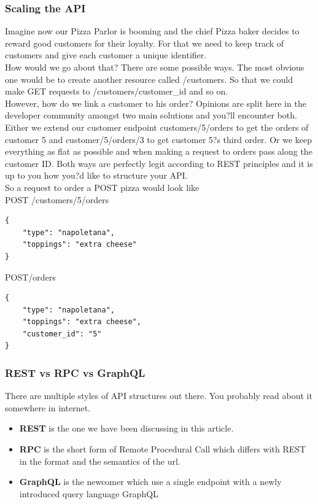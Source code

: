 \documentclass[a4paper]{article}
\begin{document}
\subsubsection{Scaling the API}
Imagine now our Pizza Parlor is booming and the chief Pizza baker decides to reward good customers for their loyalty. For that we need to keep track of customers and give each customer a unique identifier.\\

How would we go about that? There are some possible ways. The most obvious one would be to create another resource called /customers. So that we could make GET requests to /customers/customer\_id and so on.\\

However, how do we link a customer to his order? Opinions are split here in the developer community amongst two main solutions and you?ll encounter both. Either we extend our customer endpoint customers/5/orders to get the orders of customer 5 and customer/5/orders/3 to get customer 5?s third order. Or we keep everything as flat as possible and when making a request to orders pass along the customer ID. Both ways are perfectly legit according to REST principles and it is up to you how you?d like to structure your API.\\

So a request to order a POST pizza would look like\\

POST /customers/5/orders\\

\begin{lstlisting}
{
    "type": "napoletana",
    "toppings": "extra cheese"
}
\end{lstlisting}

POST/orders

\begin{lstlisting}
{
    "type": "napoletana",
    "toppings": "extra cheese",
    "customer_id": "5"
}
\end{lstlisting}

\subsubsection{REST vs RPC vs GraphQL}
There are multiple styles of API structures out there. You probably read about it somewhere in internet.
\begin{itemize}
\item \textbf{REST} is the one we have been discussing in this article.
\item \textbf{RPC} is the short form of Remote Procedural Call which differs with REST in the format and the semantics of the url.
\item \textbf{GraphQL} is the newcomer which use a single endpoint with a newly introduced query language GraphQL
\end{itemize}
\end{document}
